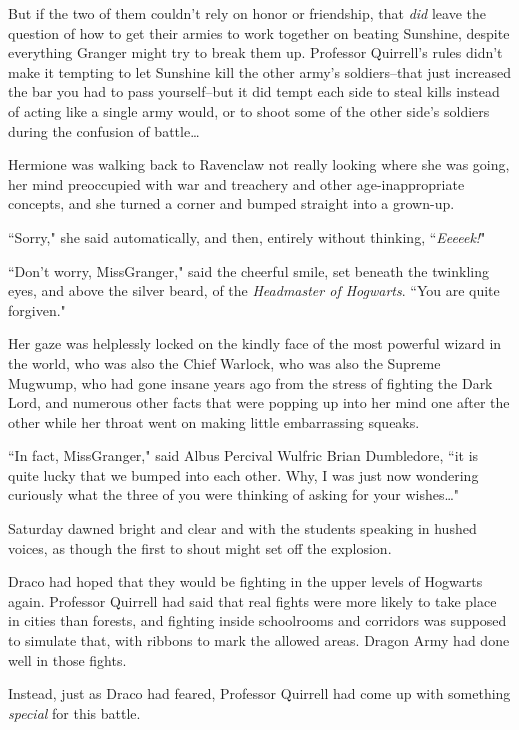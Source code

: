 But if the two of them couldn't rely on honor or friendship, that \emph{did} leave the question of how to get their armies to work together on beating Sunshine, despite everything Granger might try to break them up. Professor Quirrell's rules didn't make it tempting to let Sunshine kill the other army's soldiers\---that just increased the bar you had to pass yourself\---but it did tempt each side to steal kills instead of acting like a single army would, or to shoot some of the other side's soldiers during the confusion of battle{\ldots}

\later

Hermione was walking back to Ravenclaw not really looking where she was going, her mind preoccupied with war and treachery and other age-inappropriate concepts, and she turned a corner and bumped straight into a grown-up.

``Sorry," she said automatically, and then, entirely without thinking, ``\emph{Eeeeek!}"

``Don't worry, Miss\?Granger," said the cheerful smile, set beneath the twinkling eyes, and above the silver beard, of the \emph{Headmaster of Hogwarts}. ``You are quite forgiven."

Her gaze was helplessly locked on the kindly face of the most powerful wizard in the world, who was also the Chief Warlock, who was also the Supreme Mugwump, who had gone insane years ago from the stress of fighting the Dark Lord, and numerous other facts that were popping up into her mind one after the other while her throat went on making little embarrassing squeaks.

``In fact, Miss\?Granger," said Albus Percival Wulfric Brian Dumbledore, ``it is quite lucky that we bumped into each other. Why, I was just now wondering curiously what the three of you were thinking of asking for your wishes{\ldots}"

\later

Saturday dawned bright and clear and with the students speaking in hushed voices, as though the first to shout might set off the explosion.

\later

Draco had hoped that they would be fighting in the upper levels of Hogwarts again. Professor Quirrell had said that real fights were more likely to take place in cities than forests, and fighting inside schoolrooms and corridors was supposed to simulate that, with ribbons to mark the allowed areas. Dragon Army had done well in those fights.

Instead, just as Draco had feared, Professor Quirrell had come up with something \emph{special} for this battle.


